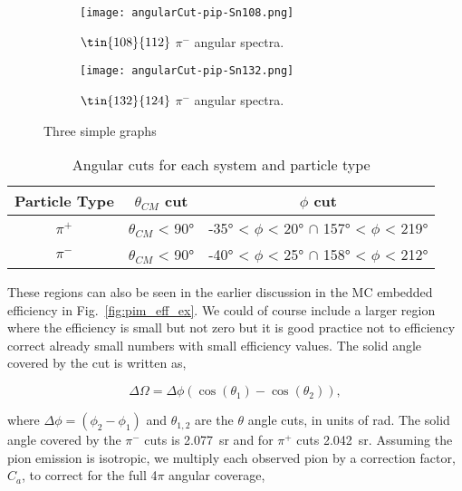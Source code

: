 \begin{figure}[!htb]
     \centering
     \begin{subfigure}[b]{0.49\textwidth}
         \centering
         \texttt{[image: angularCut-pip-Sn108.png]}
         \caption{$\tin{108}{112}$ $\pi^-$ angular spectra.}
         \label{fig:pip108angle}
     \end{subfigure}
     \hfill
     \begin{subfigure}[b]{0.49\textwidth}
         \centering
         \texttt{[image: angularCut-pip-Sn132.png]}
         \caption{$\tin{132}{124}$ $\pi^-$ angular spectra.}
         \label{fig:pip132angle}
     \end{subfigure}
        \caption{Three simple graphs}
        \label{fig:pip}
\end{figure}



 \begin{table*}[!htb]
 \centering
{}
\begin{tabular}{@{}ccc@{}}\toprule 
Particle Type & $\theta_{CM}$ cut & $\phi$ cut  \\ [0.5ex] 
 \midrule
$\pi^+$  & $\theta_{CM}$ < \ang{90}   &  \ang{-35} < $\phi$ < \ang{20} $\cap$ \ang{157} < $\phi$ < \ang{219}  \\
$\pi^-$  & $\theta_{CM}$ < \ang{90}   &  \ang{-40} < $\phi$ < \ang{25} $\cap$ \ang{158} < $\phi$ < \ang{212}   \\
 \bottomrule
\end{tabular}
\caption{Angular cuts for each system and particle type}
\label{tb:anglecuts}
\end{table*}



These regions can also be seen in the earlier discussion in the MC embedded efficiency in Fig.~\ref{fig:pim_eff_ex}.  We could of course include a larger region where the efficiency is small but not zero but it is good practice not to efficiency correct already small numbers with small efficiency values. The solid angle covered by the cut is written as,

\begin{equation}
\Delta\Omega = \Delta\phi(\cos(\theta_1) - \cos(\theta_2)),
\end{equation}

where $\Delta\phi = (\phi_2 - \phi_1)$  and $\theta_{1,2}$ are the $\theta$ angle cuts, in units of \si{\radian}. The solid angle covered by the $\pi^-$ cuts is \SI{2.077}{\steradian} and for $\pi^+$ cuts \SI{2.042}{\steradian}. Assuming the pion emission is isotropic, we multiply each observed pion by a correction factor, $C_a$, to correct for the full 4$\pi$ angular coverage, 

